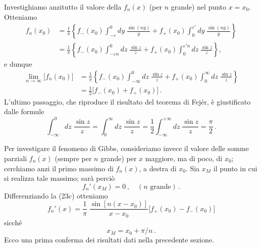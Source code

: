 \documentclass[11pt, a4paper]{book}
\numberwithin{equation}{section}
\begin{document}
Investighiamo anzitutto il valore della $f_n(x)$ (per $n$ grande) nel punto $x=x_0$. Otteniamo
\begin{align}
  f_n(x_0) &= \frac{1}{\pi}\left\{f_-(x_0)\int_{-\varepsilon}^{0} dy\;\frac{\sin(ny)}{y}
    + f_+(x_0)\int_{0}^{\varepsilon'} dy\;\frac{\sin(ny)}{y}\right\} \tag{24a}\\
  &= \frac{1}{\pi}\left\{f_-(x_0)\int_{-\varepsilon n}^{0} dz\;\frac{\sin z}{z}
    + f_+(x_0)\int_{0}^{\varepsilon' n} dz\;\frac{\sin z}{z}\right\}, \tag{24b}
\end{align}
e dunque
\begin{align}
  \lim_{n\to\infty}\bigl[f_n(x_0)\bigr]
  &= \frac{1}{\pi}\left\{f_-(x_0)\int_{-\infty}^{0} dz\;\frac{\sin z}{z}
    + f_+(x_0)\int_{0}^{\infty} dz\;\frac{\sin z}{z}\right\} \tag{25a}\\
  &= \tfrac{1}{2}\bigl[f_-(x_0)+f_+(x_0)\bigr]\,. \tag{25b}
\end{align}
L'ultimo passaggio, che riproduce il risultato del teorema di Fejér, è giustificato dalle formule
\begin{equation}
  \int_{-\infty}^{0} dz\;\frac{\sin z}{z}
  = \int_{0}^{\infty} dz\;\frac{\sin z}{z}
  = \frac{1}{2}\int_{-\infty}^{+\infty} dz\;\frac{\sin z}{z} = \frac{\pi}{2}\,. \tag{26}
\end{equation}

Per investigare il fenomeno di Gibbs, consideriamo invece il valore delle somme parziali $f_n(x)$ (sempre per $n$ grande) per $x$ maggiore, ma di poco, di $x_0$; cerchiamo anzi il primo massimo di $f_n(x)$, a destra di $x_0$. Sia $x_M$ il punto in cui si realizza tale massimo; sarà perciò
\begin{equation}
  f_n'(x_M) = 0\,,\quad (n \text{ grande})\,. \tag{27}
\end{equation}
Differenziando la (23c) otteniamo
\begin{equation}
  f_n'(x) = \frac{1}{\pi}\;\frac{\sin[n(x-x_0)]}{x-x_0}\bigl[f_+(x_0)-f_-(x_0)\bigr] \tag{28}
\end{equation}
sicché
\begin{equation}
  x_M = x_0 + \pi/n\,. \tag{29}
\end{equation}
Ecco una prima conferma dei risultati dati nella precedente sezione.
\end{document}
